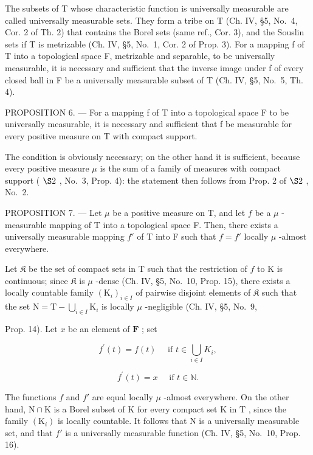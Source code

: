 The subsets of T whose characteristic function is universally measurable are called universally measurable sets. They form a tribe on T (Ch. IV, §5, No.~4, Cor. 2 of Th. 2) that contains the Borel sets (same ref., Cor. 3), and the Souslin sets if T is metrizable (Ch. IV, §5, No.~1, Cor. 2 of Prop. 3). For a mapping f of T into a topological space F, metrizable and separable, to be universally measurable, it is necessary and sufficient that the inverse image under f of every closed ball in F be a universally measurable subset of T (Ch. IV, §5, No.~5, Th. 4).

PROPOSITION 6. --- For a mapping f of T into a topological space F to be universally measurable, it is necessary and sufficient that f be measurable for every positive measure on T with compact support.

The condition is obviously necessary; on the other hand it is sufficient, because every positive measure \(\mu\) is the sum of a family of measures with compact support ( \(\S2\) , No.~3, Prop. 4): the statement then follows from Prop. 2 of \(\S2\) , No.~2.

PROPOSITION 7. --- Let \(\mu\) be a positive measure on T, and let \(f\) be a \(\mu\) -measurable mapping of T into a topological space F. Then, there exists a universally measurable mapping \(f'\) of T into F such that \(f = f'\) locally \(\mu\) -almost everywhere.

Let \(\mathfrak{K}\) be the set of compact sets in T such that the restriction of \(f\) to K is continuous; since \(\mathfrak{K}\) is \(\mu\) -dense (Ch. IV, §5, No.~10, Prop. 15), there exists a locally countable family \((\mathrm{K}_i)_{i\in I}\) of pairwise disjoint elements of \(\mathfrak{K}\) such that the set \(\mathrm{N} = \mathrm{T} - \bigcup_{i\in I}\mathrm{K}_i\) is locally \(\mu\) -negligible (Ch. IV, §5, No.~9,

Prop. 14). Let \(x\) be an element of \(\mathbf{F}\) ; set

\[
f ^ {\prime} (t) = f (t) \quad \text { if } t \in \bigcup_ {i \in I} K _ {i},
\]

\[
f ^ {\prime} (t) = x \quad \text { if } t \in \mathbb {N}.
\]

The functions \(f\) and \(f'\) are equal locally \(\mu\) -almost everywhere. On the other hand, \(\mathrm{N} \cap \mathrm{K}\) is a Borel subset of \(\mathrm{K}\) for every compact set \(\mathrm{K}\) in \(\mathrm{T}\) , since the family \((\mathrm{K}_i)\) is locally countable. It follows that \(\mathrm{N}\) is a universally measurable set, and that \(f'\) is a universally measurable function (Ch. IV, §5, No.~10, Prop. 16).

